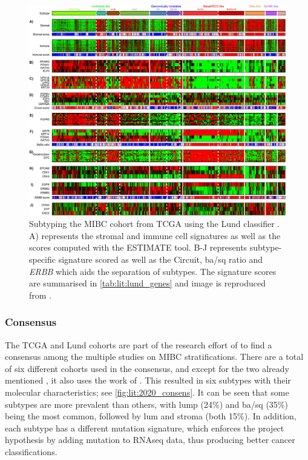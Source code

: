 \begin{figure}[!t]   
\centering
\includegraphics[width=1\textwidth,keepaspectratio]{Sections/Lit_review/Resources/Lung_subtypes.jpg}
  \caption[Summary of MIBC subtypes using Lund classifier]{Subtyping the MIBC cohort from TCGA using the Lund classifier \citep{Marzouka2018-ge}. A) represents the stromal and immune cell signatures as well as the scores computed with the ESTIMATE tool\citep{Yoshihara2013-wq}. B-J represents subtype-specific signature scored as well as the Circuit, \acrshort{ba/sq} ratio and \textit{ERBB} which aids the separation of subtypes. The signature scores are summarised in \cref{tab:lit:lund_genes} and image is reproduced from \citep{Marzouka2018-ge}.
}
\label{fig:lit:lund_fig}
\end{figure}
\FloatBarrier


\subsubsection*{Consensus} \label{s:lit:consensus_mibc}

The TCGA and Lund cohorts are part of the research effort of \citet{Kamoun2020-tj} to find a consensus among the multiple studies on MIBC stratifications. There are a total of six different cohorts used in the consensus, and except for the two already mentioned \citep{Kamoun2020-tj}, it also uses the work of \citep{Mo2018-rl, Damrauer2014-tc, Choi2014-ed, Rebouissou2014-ep}. This resulted in six subtypes with their molecular characteristics; see \cref{fig:lit:2020_consens}. It can be seen that some subtypes are more prevalent than others, with \acrfull{lump} (24\%) and \acrlong{ba/sq} (35\%) being the most common, followed by \acrlong{lum} and \acrlong{stroma} (both 15\%). In addition, each subtype has a different mutation signature, which enforces the project hypothesis by adding mutation to RNAseq data, thus producing better cancer classifications.

